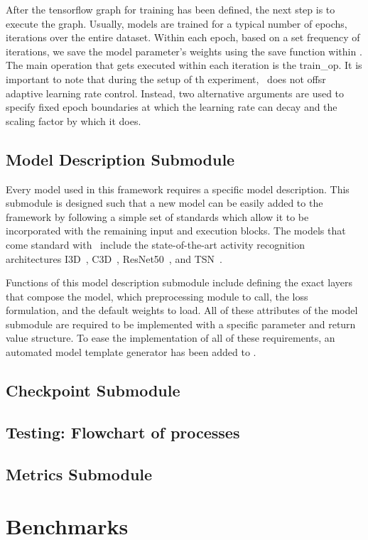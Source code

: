 \documentclass{llncs}
\begin{document}
After the tensorflow graph for training has been defined, the next step is to execute the graph. 
Usually, models are trained for a typical number of epochs, iterations over the entire dataset.
Within each epoch, based on a set frequency of iterations, we save the model parameter's weights using the save function within \checkpoint.
The main operation that gets executed within each iteration is the train\_op.
It is important to note that during the setup of th experiment, \acro~does not offsr adaptive learning rate control. Instead, two alternative arguments are used to specify fixed epoch boundaries at which the learning rate can decay and the scaling factor by which it does.

\subsection{Model Description Submodule}
\label{sec:modeldesc}

Every model used in this framework requires a specific model description.
This submodule is designed such that a new model can be easily added to the framework by following a simple set of standards which allow it to be incorporated with the remaining input and execution blocks.
The models that come standard with \acro~include the state-of-the-art activity recognition architectures I3D~\cite{}, C3D~\cite{}, ResNet50~\cite{}, and TSN~\cite{}.


Functions of this model description submodule include defining the exact layers that compose the model, which preprocessing module to call, the loss formulation, and the default weights to load.
All of these attributes of the model submodule are required to be implemented with a specific parameter and return value structure.
To ease the implementation of all of these requirements, an automated model template generator has been added to \acro.



\subsection{Checkpoint Submodule}
\label{sec:checkpoint}

\subsection{Testing: Flowchart of processes}
\label{sec:testing}

\subsection{Metrics Submodule}
\label{sec:metrics}

\section{Benchmarks}
\label{sec:benchmarks}

\clearpage



\end{document}
